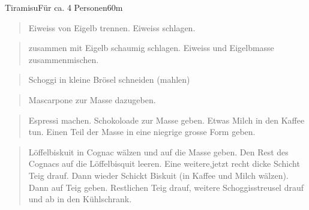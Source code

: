 \documentclass[
  a4paper,
]{article}
\begin{document}
\begin{recipe}{Tiramisu}{Für ca. 4 Personen}{60m}


\begin{quote}
Eiweiss von Eigelb trennen. Eiweiss schlagen.
\end{quote}

\freeform\hrulefill


\begin{quote}
zusammen mit Eigelb schaumig schlagen. Eiweiss und Eigelbmasse
zusammenmischen.
\end{quote}

\freeform\hrulefill


\begin{quote}
Schoggi in kleine Brösel schneiden (mahlen)
\end{quote}

\freeform\hrulefill


\begin{quote}
Mascarpone zur Masse dazugeben.
\end{quote}

\freeform\hrulefill


\begin{quote}
Espressi machen. Schokoloade zur Masse geben. Etwas Milch in den Kaffee
tun. Einen Teil der Masse in eine niegrige grosse Form geben.
\end{quote}

\freeform\hrulefill



\begin{quote}
Löffelbiskuit in Cognac wälzen und auf die Masse geben. Den Rest des
Cognacs auf die Löffelbisquit leeren. Eine weitere,jetzt recht dicke
Schicht Teig drauf. Dann wieder Schickt Biskuit (in Kaffee und Milch
wälzen). Dann auf Teig geben. Restlichen Teig drauf, weitere
Schoggisstreusel drauf und ab in den Kühlschrank.
\end{quote}

\freeform\hrulefill\newline\freeform{}\end{recipe}
\end{document}
